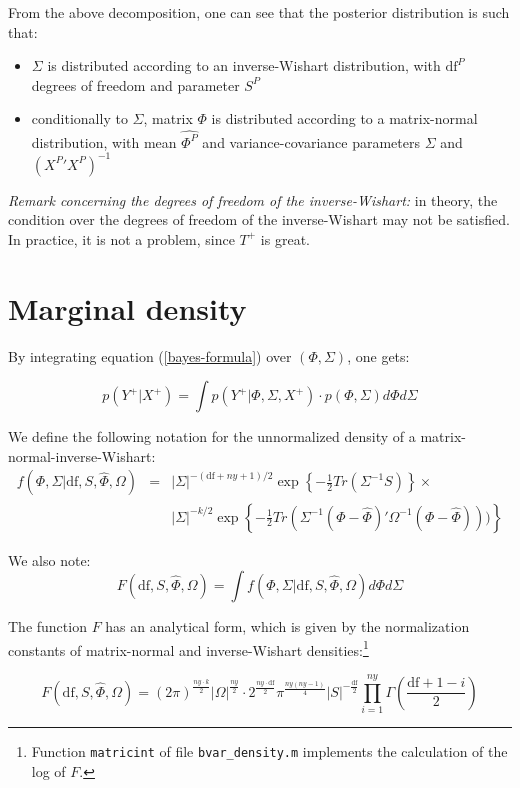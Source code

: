 \documentclass[11pt,a4paper]{article}
\newcommand{\df}{\text{df}}
\begin{document}
From the above decomposition, one can see that the posterior distribution is such that:
\begin{itemize}
\item $\Sigma$ is distributed according to an inverse-Wishart distribution, with $\df^P$ degrees of freedom and parameter $S^P$
\item conditionally to $\Sigma$, matrix $\Phi$ is distributed according to a matrix-normal distribution, with mean $\hat{\Phi^P}$ and variance-covariance parameters $\Sigma$ and $({X^P}'X^P)^{-1}$
\end{itemize}

\emph{Remark concerning the degrees of freedom of the inverse-Wishart:} in theory, the condition over the degrees of freedom of the inverse-Wishart may not be satisfied. In practice, it is not a problem, since $T^+$ is great.

\section{Marginal density}

By integrating equation (\ref{bayes-formula}) over $(\Phi, \Sigma)$, one gets:

$$p(Y^+ | X^+) = \int p(Y^+ | \Phi, \Sigma, X^+) \cdot p(\Phi, \Sigma) d\Phi d\Sigma$$

We define the following notation for the unnormalized density of a matrix-normal-inverse-Wishart:
\begin{eqnarray*}
f(\Phi,\Sigma | \df,S,\hat{\Phi},\Omega) & = & |\Sigma|^{-(\df + ny + 1)/2} \exp\left\{-\frac{1}{2}Tr(\Sigma^{-1}S)\right\} \times \\
& & |\Sigma|^{-k/2}\exp\left\{-\frac{1}{2}Tr(\Sigma^{-1}(\Phi-\hat{\Phi})'\Omega^{-1}(\Phi-\hat{\Phi})))\right\}
\end{eqnarray*}

We also note:
$$F(\df,S,\hat{\Phi},\Omega) = \int f(\Phi,\Sigma | \df,S,\hat{\Phi},\Omega)d\Phi d\Sigma$$

The function $F$ has an analytical form, which is given by the normalization constants of matrix-normal and inverse-Wishart densities:\footnote{Function \texttt{matricint} of file \texttt{bvar\_density.m} implements the calculation of the log of $F$.}

$$F(\df,S,\hat{\Phi},\Omega) = (2\pi)^{\frac{ny\cdot k}{2}} |\Omega|^{\frac{ny}{2}} \cdot 2^{\frac{ny\cdot \df}{2}} \pi^{\frac{ny(ny-1)}{4}} |S|^{-\frac{\df}{2}} \prod_{i=1}^{ny} \Gamma\left(\frac{\df + 1 - i}{2}\right) $$
\end{document}
